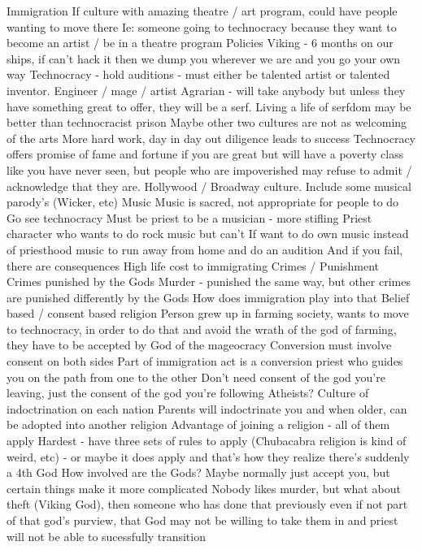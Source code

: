 \documentclass[blue]{GL2020}
\begin{document}
Immigration
If culture with amazing theatre / art program, could have people wanting to move there
Ie: someone going to technocracy because they want to become an artist / be in a theatre program
Policies
Viking - 6 months on our ships, if can’t hack it then we dump you wherever we are and you go your own way
Technocracy - hold auditions - must either be talented artist or talented inventor.  Engineer / mage / artist
Agrarian - will take anybody but unless they have something great to offer, they will be a serf.  Living a life of serfdom may be better than technocracist prison
Maybe other two cultures are not as welcoming of the arts
More hard work, day in day out diligence leads to success
Technocracy offers promise of fame and fortune if you are great but will have a poverty class like you have never seen, but people who are impoverished may refuse to admit / acknowledge that they are.  Hollywood / Broadway culture.  Include some musical parody’s (Wicker, etc)
Music
Music is sacred, not appropriate for people to do
Go see technocracy 
Must be priest to be a musician - more stifling
Priest character who wants to do rock music but can’t
If want to do own music instead of priesthood music to run away from home and do an audition
And if you fail, there are consequences
High life cost to immigrating
Crimes / Punishment
Crimes punished by the Gods
Murder - punished the same way, but other crimes are punished differently by the Gods
How does immigration play into that
Belief based / consent based religion
Person grew up in farming society, wants to move to technocracy, in order to do that and avoid the wrath of the god of farming, they have to be accepted by God of the mageocracy
Conversion must involve consent on both sides
Part of immigration act is a conversion priest who guides you on the path from one to the other
Don’t need consent of the god you’re leaving, just the consent of the god you’re following
Atheists?
Culture of indoctrination on each nation
Parents will indoctrinate you and when older, can be adopted into another religion
Advantage of joining a religion - all of them apply
Hardest - have three sets of rules to apply (Chubacabra religion is kind of weird, etc) - or maybe it does apply and that’s how they realize there’s suddenly a 4th God
How involved are the Gods?
Maybe normally just accept you, but certain things make it more complicated
Nobody likes murder, but what about theft (Viking God), then someone who has done that previously even if not part of that god’s purview, that God may not be willing to take them in and priest will not be able to sucessfully transition
\end{document}
